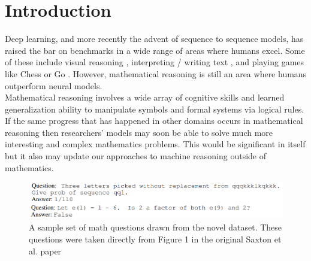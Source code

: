 










\section{Introduction}

Deep learning, and more recently the advent of sequence to sequence models, has raised the bar on benchmarks in a wide range of areas where humans excel. Some of these include visual reasoning \supercite{voulodimos2018deep}, interpreting / writing text \supercite{radford2019language}, and playing games like Chess or Go \supercite{silver2017mastering}. However, mathematical reasoning is still an area where humans  outperform neural models. \\ 

Mathematical reasoning involves a wide array of cognitive skills and learned generalization ability to manipulate symbols and formal systems via logical rules. If the same progress that has happened in other domains occurs in mathematical reasoning then researchers' models may soon be able to solve much more interesting and complex mathematics problems. This would be significant in itself but it also may update our approaches to machine reasoning outside of mathematics. \\ 


\begin{figure}[hbt!]
\includegraphics[width=12cm]{images/math_examples_bunch_reduced.PNG}
\centering
\caption{A sample set of math questions drawn from the novel dataset. These questions were taken directly from Figure 1 in the original Saxton et al. paper \supercite{DBLP:journals/corr/abs-1904-01557}}
\label{fig:mathexamples}
\end{figure}

